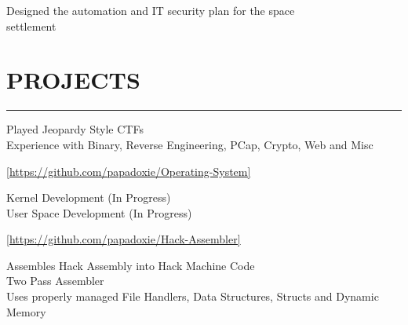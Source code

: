 \documentclass[]{resume}
\begin{document}
\begin{minipage}[t]{0.66\textwidth}
    \vspace{8pt}
     
    \vspace{4pt}
    \begin{minipage}{0.85\textwidth\vspace{4pt}}
        Designed the automation and IT security plan for the space\\settlement
    \end{minipage}



    \section{PROJECTS}
    \noindent\rule{12.5 cm}{0.4pt}

     
    \vspace{4pt}
    \begin{minipage}{0.85\textwidth\vspace{2pt}}
        Played Jeopardy Style CTFs\\
        Experience with Binary, Reverse Engineering, PCap, Crypto, Web and Misc\\
    \end{minipage}

    \vspace{8pt}
     
    \href{https://github.com/papadoxie/Operating-System}{[https://github.com/papadoxie/Operating-System]}
    \vspace{4pt}
    \begin{minipage}{0.85\textwidth\vspace{2pt}}
        Kernel Development (In Progress)\\
        User Space Development (In Progress)\\
    \end{minipage}

    \vspace{8pt}
     
    \vspace{4pt}
    \href{https://github.com/papadoxie/Hack-Assembler}{[https://github.com/papadoxie/Hack-Assembler]}
    \begin{minipage}{0.85\textwidth\vspace{2pt}}
        Assembles Hack Assembly into Hack Machine Code\\
        Two Pass Assembler\\
        Uses properly managed File Handlers, Data Structures, Structs and Dynamic Memory
    \end{minipage}

\end{minipage}
\end{document}
